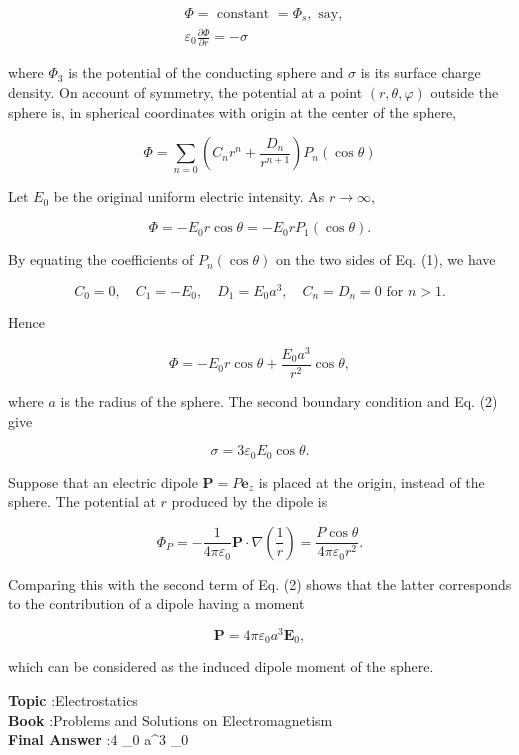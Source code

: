\documentclass[10pt]{article}
\begin{document}
$$
\begin{aligned}
&\Phi=\text { constant }=\Phi_{s}, \text { say, } \\
&\varepsilon_{0} \frac{\partial \Phi}{\partial r}=-\sigma
\end{aligned}
$$

where $\Phi_{3}$ is the potential of the conducting sphere and $\sigma$ is its surface charge density. On account of symmetry, the potential at a point $(r, \theta, \varphi)$ outside the sphere is, in spherical coordinates with origin at the center of the sphere,

$$
\Phi=\sum_{n=0}\left(C_{n} r^{n}+\frac{D_{n}}{r^{n+1}}\right) P_{n}(\cos \theta)
$$

Let $E_{0}$ be the original uniform electric intensity. As $r \rightarrow \infty$,

$$
\Phi=-E_{0} r \cos \theta=-E_{0} r P_{1}(\cos \theta) .
$$

By equating the coefficients of $P_{n}(\cos \theta)$ on the two sides of Eq.
(1), we have

$$
C_{0}=0, \quad C_{1}=-E_{0}, \quad D_{1}=E_{0} a^{3}, \quad C_{n}=D_{n}=0 \text { for } n>1 .
$$

Hence

$$
\Phi=-E_{0} r \cos \theta+\frac{E_{0} a^{3}}{r^{2}} \cos \theta,
$$

where $a$ is the radius of the sphere. The second boundary condition and Eq.
(2) give

$$
\sigma=3 \varepsilon_{0} E_{0} \cos \theta .
$$

 Suppose that an electric dipole $\mathbf{P}=P \mathbf{e}_{z}$ is placed at the origin, instead of the sphere. The potential at $r$ produced by the dipole is

$$
\Phi_{P}=-\frac{1}{4 \pi \varepsilon_{0}} \mathbf{P} \cdot \nabla\left(\frac{1}{r}\right)=\frac{P \cos \theta}{4 \pi \varepsilon_{0} r^{2}} .
$$

Comparing this with the second term of Eq.
(2) shows that the latter corresponds to the contribution of a dipole having a moment

$$
\mathbf{P}=4 \pi \varepsilon_{0} a^{3} \mathbf{E}_{0},
$$

which can be considered as the induced dipole moment of the sphere.

\textbf{Topic} :Electrostatics\\
\textbf{Book} :Problems and Solutions on Electromagnetism\\
\textbf{Final Answer} :4 \pi \varepsilon_{0} a^{3} _{0}\\
\end{document}

